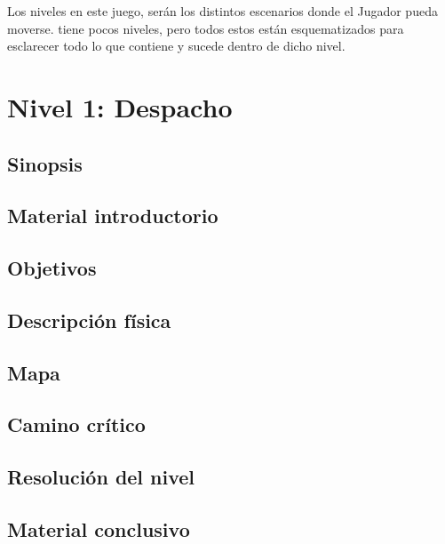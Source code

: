 Los niveles en este juego, serán los distintos escenarios donde el Jugador pueda moverse. \nombrejuego tiene pocos niveles, pero todos estos están esquematizados para esclarecer todo lo que contiene y sucede dentro de dicho nivel.
    
    \section{Nivel 1: Despacho}
        \subsection{Sinopsis}
        
        \subsection{Material introductorio}
        \subsection{Objetivos}
        \subsection{Descripción física}
        \subsection{Mapa}
        \subsection{Camino crítico}
        \subsection{Resolución del nivel}
        \subsection{Material conclusivo}
        
